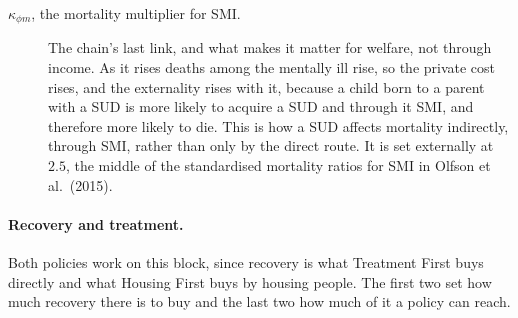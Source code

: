 \documentclass[10pt]{article}
\begin{document}
\begin{description}
\item[$\kappa_{\phi m}$, the mortality multiplier for SMI.] The chain's last link,
and what makes it matter for welfare, not through income. As it
rises deaths among the mentally ill rise, so the private cost rises, and the
externality rises with it, because a child born to a parent with a SUD is
more likely to acquire a SUD and through it SMI, and therefore more likely to die.
This is how a SUD affects mortality indirectly, through SMI, rather
than only by the direct route. It is set
externally at $2.5$, the middle of the standardised mortality ratios for SMI in
Olfson et al.\ (2015).
\end{description}

\paragraph{Recovery and treatment.} Both policies work on this block,
since recovery is what Treatment First buys directly and what Housing First buys by
housing people. The first two set how much recovery there is to buy and the last two
how much of it a policy can reach.
\end{document}
